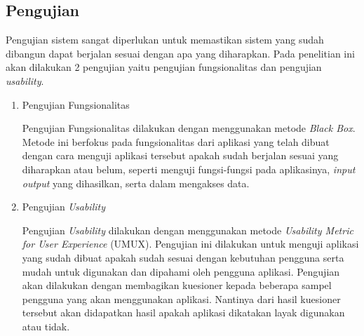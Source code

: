 \subsection{Pengujian}
Pengujian sistem sangat diperlukan untuk memastikan sistem yang sudah dibangun dapat berjalan sesuai dengan apa yang diharapkan. Pada penelitian ini akan dilakukan 2 pengujian yaitu pengujian fungsionalitas dan pengujian \textit{usability}.

\begin{enumerate}
	\pagebreak
	\item Pengujian Fungsionalitas
	\par Pengujian Fungsionalitas dilakukan dengan menggunakan metode \textit{Black Box}. Metode ini berfokus pada fungsionalitas dari aplikasi yang telah dibuat dengan cara menguji aplikasi tersebut apakah sudah berjalan sesuai yang diharapkan atau belum, seperti menguji fungsi-fungsi pada aplikasinya, \textit{input output} yang dihasilkan, serta dalam mengakses data.
	\item Pengujian \textit{Usability}
	\par Pengujian \textit{Usability} dilakukan dengan menggunakan metode \textit{Usability Metric for User Experience} (UMUX). Pengujian ini dilakukan untuk menguji aplikasi yang sudah dibuat apakah sudah sesuai dengan kebutuhan pengguna serta mudah untuk digunakan dan dipahami oleh pengguna aplikasi. Pengujian akan dilakukan dengan membagikan kuesioner kepada beberapa sampel pengguna yang akan menggunakan aplikasi. Nantinya dari hasil kuesioner tersebut akan didapatkan hasil apakah aplikasi dikatakan layak digunakan atau tidak. 
\end{enumerate}

